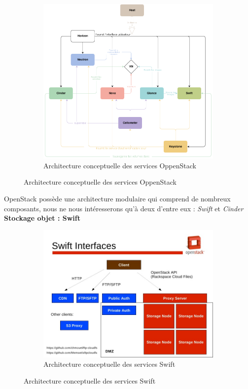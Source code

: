\documentclass{article}
\begin{document}
\begin{figure}[h!]
	\centering
  	\begin{subfigure}[b]{0.85\linewidth}
	\includegraphics[width=\linewidth]{openstack.png}
	\caption{Architecture conceptuelle des services OppenStack}
  	\end{subfigure}
\end{figure}
\newpage
OpenStack possède une architecture modulaire qui comprend de nombreux composants, nous ne nous intéresserons qu'à deux d'entre eux : \textit{Swift} et \textit{Cinder}
\newline
\newline
\textbf{Stockage objet : Swift}

\begin{figure}[h!]
	\centering
  	\begin{subfigure}[b]{1.0\linewidth}
	\includegraphics[width=\linewidth]{swift.jpeg}
	\caption{Architecture conceptuelle des services Swift}
  	\end{subfigure}
\end{figure}
\end{document}
